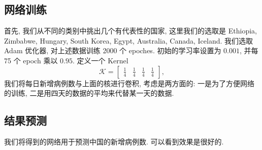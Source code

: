 \documentclass[UTF8]{ctexart}
\begin{document}
    \subsection*{网络训练}
    首先, 我们从不同的类别中挑出几个有代表性的国家, 这里我们的选取是 Ethiopia, Zimbabwe, Hungary, South Korea, Egypt, Australia, Canada, Iceland. 我们选取 Adam 优化器, 对上述数据训练 2000 个 epoches. 初始的学习率设置为 $0.001$, 并每 75 个 epoch 乘以 $0.95$. 定义一个 Kernel
	\[
	\mathcal{K} =
	\begin{bmatrix}
		\displaystyle\frac{1}{4}&\displaystyle\frac{1}{4}&\displaystyle\frac{1}{4}&\displaystyle\frac{1}{4}
	\end{bmatrix},
	\]
	我们将每日新增病例数与上面的核进行卷积, 考虑是两方面的: 一是为了方便网络的训练, 二是用四天的数据的平均来代替某一天的数据.
	\begin{figure}[htbp]
	    \centering
	\end{figure}
	\subsection*{结果预测}
	我们将得到的网络用于预测中国的新增病例数. 可以看到效果是很好的.
	\begin{figure}[htbp]
	    \centering
	\end{figure}
\end{document}

